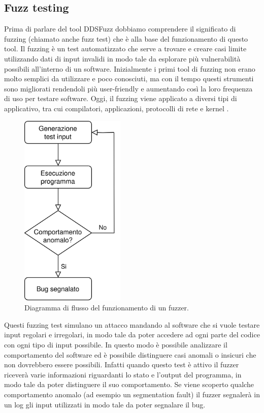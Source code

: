 \subsection{Fuzz testing}
Prima di parlare del tool DDSFuzz dobbiamo comprendere 
il significato di fuzzing (chiamato anche fuzz test) che è
alla base del funzionamento di questo tool. Il fuzzing è un test
automatizzato che serve a trovare e creare casi limite utilizzando
dati di input invalidi in modo tale da esplorare più vulnerabilità
possibili all'interno di un software. 
Inizialmente i primi tool di fuzzing non erano molto 
semplici da utilizzare e poco conosciuti, 
ma con il tempo questi strumenti
sono migliorati rendendoli più user-friendly e aumentando così la 
loro frequenza di uso per testare software. Oggi, il fuzzing viene
applicato a diversi tipi di applicativo, tra cui compilatori, 
applicazioni, protocolli di rete e kernel \cite{8371326}.

\begin{figure}[H]
    \centering
    \includegraphics[width=5cm, keepaspectratio]{img/Diagramma di flusso fuzzer.jpg}
    \caption{Diagramma di flusso del funzionamento di un fuzzer.}
    \label{funzionamento fuzzer}
\end{figure}

Questi fuzzing test simulano un attacco mandando al software
che si vuole testare input regolari e irregolari, 
in modo tale da poter 
accedere ad ogni parte del codice con ogni tipo di input possibile.
In questo modo è possibile analizzare il comportamento del software
ed è possibile distinguere casi anomali o insicuri che non dovrebbero
essere possibili. Infatti quando questo test è attivo il fuzzer riceverà
varie informazioni riguardanti lo stato e l'output del programma, in 
modo tale da poter distinguere il suo comportamento. Se viene scoperto
qualche comportamento anomalo (ad esempio un segmentation fault) il 
fuzzer segnalerà in un log gli input utilizzati in modo tale da poter 
segnalare il bug.

